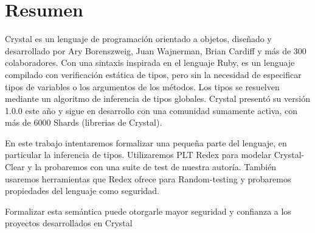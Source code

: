\setchapterpreamble[u]{\margintoc}
\chapter{Resumen}

 Crystal es un lenguaje de programación orientado a objetos, diseñado y desarrollado por Ary Borenszweig, Juan Wajnerman, Brian Cardiff y más de 300 colaboradores.
  Con una sintaxis inspirada en el lenguaje Ruby, es un lenguaje compilado con verificación estática de tipos, pero sin la necesidad de especificar tipos de variables o los argumentos de los métodos.
  Los tipos se resuelven mediante un algoritmo de inferencia de tipos globales.
  Crystal presentó su versión 1.0.0 este año y sigue en desarrollo con una comunidad sumamente activa, con más de 6000 Shards (librerias de Crystal).

 En este trabajo intentaremos formalizar una pequeña parte del lenguaje, en particular la inferencia de tipos.
  Utilizaremos PLT Redex para modelar Crystal-Clear y la probaremos con una suite de test de nuestra autoría.
  También usaremos herramientas que Redex ofrece para Random-testing y probaremos propiedades del lenguaje como seguridad.

 Formalizar esta semántica puede otorgarle mayor seguridad y confianza a los proyectos desarrollados en Crystal